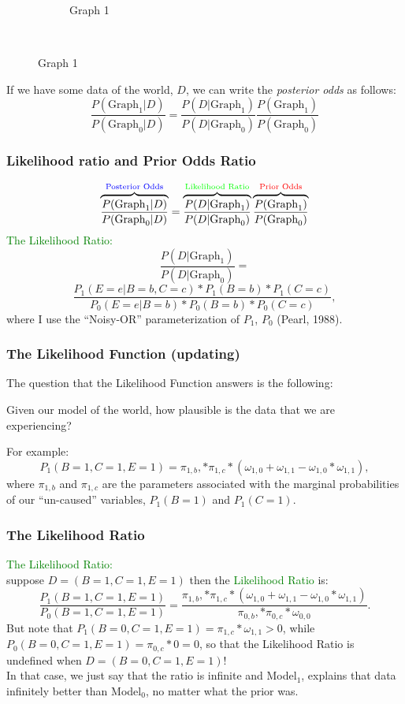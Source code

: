 \documentclass{beamer}
\begin{document}
\begin{frame}
\begin{figure}
\begin{subfigure}[b]{0.2\textwidth}
                \caption{Graph 1}
                \label{fig:tiger}
        \end{subfigure}
        ~ %
\end{figure}
If we have some data of the world, $D$, we can write the \textit{posterior odds} as follows:
$$\frac{P(\text{Graph}_1 | D)}{P(\text{Graph}_0 | D)} = \frac{P(D | \text{Graph}_1)}{P(D | \text{Graph}_0)} \frac{P(\text{Graph}_1)}{P(\text{Graph}_0)}$$
\end{frame}

\begin{frame}
\frametitle{Likelihood ratio and Prior Odds Ratio}
$$\overbrace{\frac{P(\text{Graph}_1 | D)}{P(\text{Graph}_0 | D)}}^\text{\textcolor{blue}{Posterior Odds}} = \overbrace{\frac{P(D | \text{Graph}_1)}{P(D | \text{Graph}_0)}}^\text{\textcolor{green}{Likelihood Ratio}} \overbrace{\frac{P(\text{Graph}_1)}{P(\text{Graph}_0)}}^\text{\textcolor{red}{Prior Odds}}$$
\textcolor{green}{The Likelihood Ratio:}
$$\frac{P(D | \text{Graph}_1)}{P(D | \text{Graph}_0)}=$$
$$\frac{P_1(E=e | B=b, C=c)*P_1(B=b)*P_1(C=c)}{P_0(E=e | B=b)*P_0(B=b)*P_0(C=c)},$$
where I use the ``Noisy-OR'' parameterization of $P_1$, $P_0$ (Pearl, 1988).
\end{frame}
\begin{frame}
\frametitle{The Likelihood Function (updating)}
The question that the Likelihood Function answers is the following:
\begin{center}
Given our model of the world, how plausible is the data that we are experiencing?
\end{center}
For example:
$$P_1(B=1, C=1, E=1) =\pi_{1,b}, * \pi_{1,c} * \left(\omega_{1, 0} + \omega_{1, 1} - \omega_{1, 0} * \omega_{1, 1}\right),$$
where $\pi_{1,b}$ and $\pi_{1,c}$ are the parameters associated with the marginal probabilities of our ``un-caused'' variables, $P_1(B=1)$ and $P_1(C=1)$.
\end{frame}
\begin{frame}
\frametitle{The Likelihood Ratio}
\textcolor{green}{The Likelihood Ratio:}\\
suppose $D=(B=1, C=1, E=1)$ then the \textcolor{green}{Likelihood Ratio} is:
$$\frac{P_1(B=1, C=1, E=1)}{P_0(B=1, C=1, E=1)} = \frac{\pi_{1,b}, * \pi_{1,c} * \left(\omega_{1, 0} + \omega_{1, 1} - \omega_{1, 0} * \omega_{1, 1}\right)}{\pi_{0,b}, * \pi_{0,c} * \omega_{0, 0}}.$$
But note that $P_1(B=0, C=1, E=1)=\pi_{1, c} *\omega_{1, 1}>0$, while $P_0(B=0, C=1, E=1)=\pi_{0, c}* 0 = 0$, so that the Likelihood Ratio is undefined when $D=(B=0, C=1, E=1)$!\\
In that case, we just say that the ratio is infinite and Model$_1$, explains that data infinitely better than Model$_0$, no matter what the prior was.
\end{frame}
\end{document}
